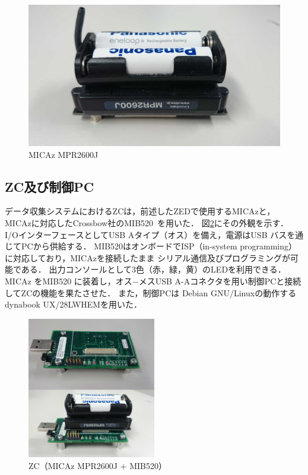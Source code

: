 \documentclass[12pt]{jreport}
\begin{document}
\begin{figure}[bt]
 \centering
 \includegraphics[width=\columnwidth]{figure/mpr2600j.pdf}
 \caption{MICAz MPR2600J}
 \label{fig:mpr2600j}
\end{figure}

\subsection{ZC及び制御PC}

データ収集システムにおけるZCは，前述したZEDで使用するMICAzと，
MICAzに対応したCrossbow社のMIB520~\cite{Device:}を用いた．
図\ref{fig:zc}にその外観を示す．
I/OインターフェースとしてUSB Aタイプ（オス）を備え，電源はUSB バスを通じてPCから供給する．
MIB520はオンボードでISP（in-system programming）に対応しており，MICAzを接続したまま
シリアル通信及びプログラミングが可能である．
出力コンソールとして3色（赤，緑，黄）のLEDを利用できる．
MICAz をMIB520 に装着し，オス−メスUSB A-Aコネクタを用い制御PCと接続してZCの機能を果たさせた．
また，制御PCは
Debian GNU/Linuxの動作するdynabook UX/28LWHEMを用いた．

\begin{figure}[bt]
 \centering
 \includegraphics[width=0.5\textwidth]{figure/zc.pdf}
 \caption{ZC（MICAz MPR2600J + MIB520）}
 \label{fig:zc}
\end{figure}
\end{document}
